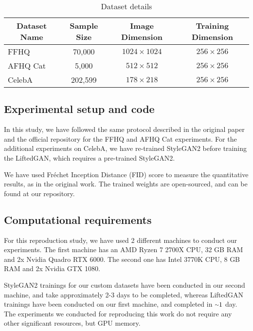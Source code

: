 \begin{table}[h!]
\centering
\caption{Dataset details}
\begin{tabular}{|l|c|c|c|}
\hline
\multicolumn{1}{|c|}{\textbf{Dataset Name}} & \textbf{Sample Size} & \textbf{Image Dimension} & \textbf{Training Dimension} \\ \hline
FFHQ                                        & 70,000               & $1024 \times 1024 $    & $256 \times 256$          \\ \hline
AFHQ Cat                                    & 5,000                 & $512 \times 512$  & $256 \times 256$              \\ \hline
CelebA                                      & 202,599              & $178 \times 218$     & $256 \times 256$             \\ \hline
\end{tabular}
\label{tab:datasets}
\end{table}

\subsection{Experimental setup and code}
In this study, we have followed the same protocol described in the original paper and the official repository for the FFHQ and AFHQ Cat experiments. For the additional experiments on CelebA, we have re-trained StyleGAN2 before training the LiftedGAN, which requires a pre-trained StyleGAN2.

We have used Fr\'echet Inception Distance (FID) score to measure the quantitative results, as in the original work. The trained weights are open-sourced, and can be found at our repository.


\subsection{Computational requirements}

For this reproduction study, we have used 2 different machines to conduct our experiments. The first machine has an AMD Ryzen 7 2700X CPU, 32 GB RAM and 2x Nvidia Quadro RTX 6000. The second one has Intel 3770K CPU, 8 GB RAM and 2x Nvidia GTX 1080.

StyleGAN2 trainings for our custom datasets have been conducted in our second machine, and take approximately 2-3 days to be completed, whereas LiftedGAN trainings have been conducted on our first machine, and completed in ${\raise.17ex\hbox{$\scriptstyle\mathtt{\sim}$}}1$ day. The experiments we conducted for reproducing this work do not require any other significant resources, but GPU memory. 

